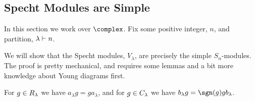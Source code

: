 \subsection{Specht Modules are Simple}
In this section we work over \(\complex\).
Fix some positive integer, \(n\), and partition, \(\lambda \vdash n\).

We will show that the Specht modules, \(V_\lambda\), are precisely the simple \(S_n\)-modules.
The proof is pretty mechanical, and requires some lemmas and a bit more knowledge about Young diagrams first.

\begin{lma}{}{}
    For \(g \in R_\lambda\) we have \(a_\lambda g = g a_\lambda\), and for \(g \in C_\lambda\) we have \(b_\lambda g = \sgn(g) g b_\lambda\).
\end{lma}

